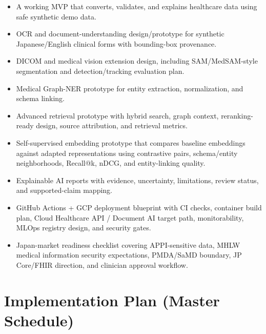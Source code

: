 \documentclass[11pt,a4paper]{article}
\begin{document}
\begin{itemize}
  \item A working MVP that converts, validates, and explains healthcare data using safe synthetic demo data.
  \item OCR and document-understanding design/prototype for synthetic Japanese/English clinical forms with bounding-box provenance.
  \item DICOM and medical vision extension design, including SAM/MedSAM-style segmentation and detection/tracking evaluation plan.
  \item Medical Graph-NER prototype for entity extraction, normalization, and schema linking.
  \item Advanced retrieval prototype with hybrid search, graph context, reranking-ready design, source attribution, and retrieval metrics.
  \item Self-supervised embedding prototype that compares baseline embeddings against adapted representations using contrastive pairs, schema/entity neighborhoods, Recall@k, nDCG, and entity-linking quality.
  \item Explainable AI reports with evidence, uncertainty, limitations, review status, and supported-claim mapping.
  \item GitHub Actions + GCP deployment blueprint with CI checks, container build plan, Cloud Healthcare API / Document AI target path, monitorability, MLOps registry design, and security gates.
  \item Japan-market readiness checklist covering APPI-sensitive data, MHLW medical information security expectations, PMDA/SaMD boundary, JP Core/FHIR direction, and clinician approval workflow.
\end{itemize}

\section{Implementation Plan (Master Schedule)}
\end{document}
